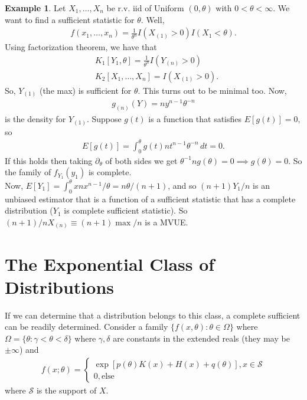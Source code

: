 \documentclass{book}
\theoremstyle{definition}
\newtheorem{exmp}{Example}[section]
\newcommand{\p}{\partial}
\newcommand{\nn}{\nonumber}
\newcommand{\Else}{\text{else}}
\newcommand{\f}[2]{\frac{#1}{#2}}
\newcommand{\lb}{\left[}
\newcommand{\rb}{\right]}
\begin{document}
\begin{exmp}
	Let $X_1,\dots,X_n$ be r.v. iid of Uniform $(0,\theta)$ with $0 < \theta < \infty$. We want to find a sufficient statistic for $\theta$. Well,
	\begin{align}
	f(x_1,\dots,x_n) = \f{1}{\theta^n}I(X_{(1)} > 0)I(X_{1} < \theta).
	\end{align}
	Using factorization theorem, we have that 
	\begin{align}
	&K_1[Y_1,\theta] = \f{1}{\theta^n}I(Y_{(n)} > 0)\nn\\
	&K_2[X_1,\dots,X_n] = I(X_{(1)} > 0).
	\end{align}
	So, $Y_{(1)}$ (the max) is sufficient for $\theta$. This turns out to be minimal too. Now,
	\begin{align}
	g_{(n)}(Y) = ny^{n-1}\theta^{-n}
	\end{align}
	is the density for $Y_{(1)}$. Suppose $g(t)$ is a function that satisfies $E[g(t)] = 0$, so 
	\begin{align}
	E[g(t)] = \int^\theta_0 g(t)nt^{n-1}\theta^{-n}\,dt = 0.
	\end{align}
	If this holds then taking $\p_\theta$ of both sides we get $\theta^{-1}ng(\theta) = 0 \implies g(\theta)= 0$. So the family of $f_{Y_1}(y_1)$ is complete. \\
	
	Now, $E[Y_1] = \int^\theta_0 x nx^{n-1}/\theta = n\theta/(n+1)$, and so $(n+1)Y_1/n$ is an unbiased estimator that is a function of a sufficient statistic that has a complete distribution ($Y_1$ is complete sufficient statistic). So $(n+1)/n X_{(n)} \equiv (n+1)\max/n$ is a MVUE.  
\end{exmp}






\section{The Exponential Class of Distributions}


If we can determine that a distribution belongs to this class, a complete sufficient can be readily determined. Consider a family $\{ f(x,\theta): \theta \in \Omega\}$ where $\Omega = \{ \theta: \gamma < \theta< \delta \}$ where $\gamma, \delta$ are constants in the extended reals (they may be $\pm \infty$) and 
\begin{align}
f(x;\theta) = \begin{cases}
\exp\lb p(\theta)K(x)+ H(x) + q(\theta) \rb, x\in \mathcal{S}\\
0,\Else
\end{cases}
\end{align} 
where $\mathcal{S}$ is the support of $X$. 
\end{document}

